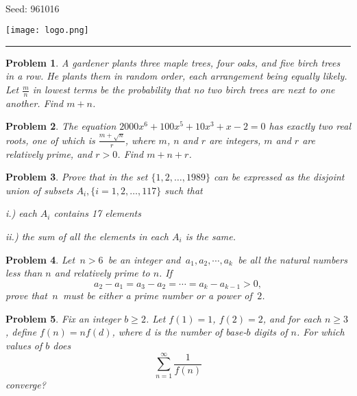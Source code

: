 \documentclass[12pt]{article}
\newtheorem{opg}{Problem}
\begin{document}
\parbox{0.6\textwidth}{ \\[2ex] {\Large Seed: 961016}}
\parbox{0.4\textwidth}{\texttt{[image: logo.png]}}

\hrule

\begin{opg}
A gardener plants three maple trees, four oaks, and five birch trees in a row. He plants them in random order, each arrangement being equally likely. Let $\frac m n$ in lowest terms be the probability that no two birch trees are next to one another. Find $m+n$.


\end{opg}
\begin{opg}
The equation $2000x^6+100x^5+10x^3+x-2=0$ has exactly two real roots, one of which is $\frac{m+\sqrt{n}}r$, where $m$, $n$ and $r$ are integers, $m$ and $r$ are relatively prime, and $r>0$. Find $m+n+r$.


\end{opg}
\begin{opg}
Prove that in the set $\{1,2, \ldots, 1989\}$ can be expressed as the disjoint union of subsets $A_i, \{i = 1,2, \ldots, 117\}$ such that

i.) each $A_i$ contains 17 elements

ii.) the sum of all the elements in each $A_i$ is the same.




\end{opg}
\begin{opg}
Let $\,n > 6\,$ be an integer and $\,a_{1},a_{2},\cdots ,a_{k}\,$ be all the natural numbers less than $n$ and relatively prime to $n$. If
\[a_{2} - a_{1} = a_{3} - a_{2} = \cdots = a_{k} - a_{k - 1} > 0,\]
prove that $\,n\,$ must be either a prime number or a power of $\,2$.


\end{opg}
\begin{opg}
Fix an integer $b \geq 2$. Let $f(1) = 1$, $f(2) = 2$, and for each
$n \geq 3$, define $f(n) = n f(d)$, where $d$ is the number of
base-$b$ digits of $n$. For which values of $b$ does
\[
\sum_{n=1}^\infty \frac{1}{f(n)}
\]
converge?

\end{opg}
\end{document}
